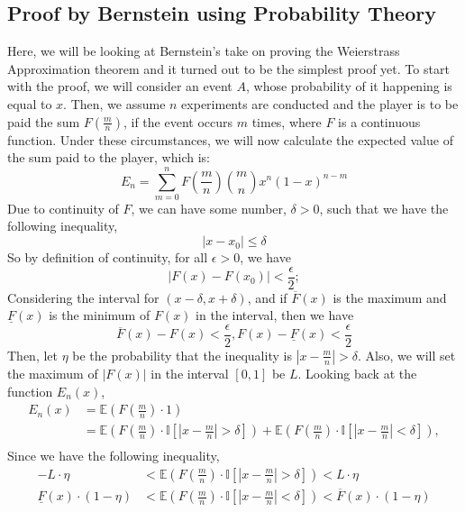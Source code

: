 \documentclass{article}
\begin{document}
\subsection{Proof by Bernstein using Probability Theory}\label{subsec:pbb}
Here, we will be looking at Bernstein's take on proving the Weierstrass Approximation theorem and it turned out to be the simplest proof yet.
To start with the proof, we will consider an event $A$, whose probability of it happening is equal to $x$. 
Then, we assume $n$ experiments are conducted and the player is to be paid the sum $F(\frac{m}{n})$, if the event occurs $m$ times, where $F$ is a continuous function.\cite{bertrand15}
Under these circumstances, we will now calculate the expected value of the sum paid to the player, which is:
\begin{equation*}
    E_n = \sum_{m=0}^{n} F \left( \frac{m}{n} \right) \binom{m}{n} x^n (1-x)^{n-m}
\end{equation*}
Due to continuity of $F$, we can have some number, $\delta>0$, such that we have the following inequality,
\begin{equation*}
|x-x_0|\leq\delta
\end{equation*}
So by definition of continuity, for all $\epsilon>0$, we have
\begin{equation*}
    |F(x)-F(x_0)|<\frac{\epsilon}{2};
\end{equation*}
Considering the interval for $(x-\delta,x+\delta)$, and if $\overline{F}(x)$ is the maximum and $\underline{F}(x)$ is the minimum of $F(x)$ in the interval, then we have
\begin{equation}\label{eqn:eps}
    \overline{F}(x)-F(x)<\frac{\epsilon}{2}, F(x)-\underline{F}(x)<\frac{\epsilon}{2}
\end{equation}
Then, let $\eta$ be the probability that the inequality is $|x-\frac{m}{n}|>\delta$.
Also, we will set the maximum of $|F(x)|$ in the interval $[0,1]$ be $L$.
Looking back at the function $E_n(x)$,
\begin{align*}
    E_n(x) &= \mathbb{E}\left(F\left(\frac{m}{n}\right)\cdot1\right) \\
    &= \mathbb{E}\left(F\left(\frac{m}{n}\right)\cdot \mathbb{I}\left[|x-\frac{m}{n}|>\delta\right]\right) + \mathbb{E}\left(F\left(\frac{m}{n}\right)\cdot \mathbb{I}\left[|x-\frac{m}{n}|<\delta\right]\right),\\
\end{align*}
Since we have the following inequality,
\begin{align*}
    -L\cdot\eta&<\mathbb{E}\left(F\left(\frac{m}{n}\right)\cdot \mathbb{I}\left[|x-\frac{m}{n}|>\delta\right]\right)<L\cdot\eta\\
    \underline{F}(x)\cdot(1-\eta)&<\mathbb{E}\left(F\left(\frac{m}{n}\right)\cdot \mathbb{I}\left[|x-\frac{m}{n}|<\delta\right]\right)<\overline{F}(x)\cdot (1-\eta)
\end{align*}
\end{document}
